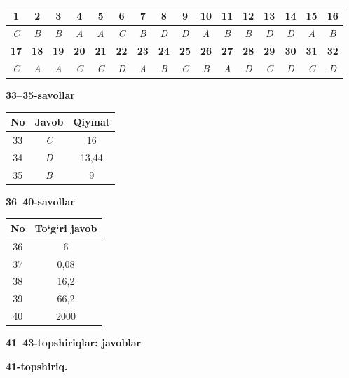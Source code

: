\documentclass[11pt,a4paper]{article}
\begin{document}
\noindent\begin{tabular}{|c|c|c|c|c|c|c|c|c|c|c|c|c|c|c|c|}\hline
\textbf{1} & \textbf{2} & \textbf{3} & \textbf{4} & \textbf{5} & \textbf{6} & \textbf{7} & \textbf{8} & \textbf{9} & \textbf{10} & \textbf{11} & \textbf{12} & \textbf{13} & \textbf{14} & \textbf{15} & \textbf{16}\\\hline
\textsl{C} & \textsl{B} & \textsl{B} & \textsl{A} & \textsl{A} & \textsl{C} & \textsl{B} & \textsl{D} & \textsl{D} & \textsl{A} & \textsl{B} & \textsl{B} & \textsl{D} & \textsl{D} & \textsl{A} & \textsl{B}\\\hline
\textbf{17} & \textbf{18} & \textbf{19} & \textbf{20} & \textbf{21} & \textbf{22} & \textbf{23} & \textbf{24} & \textbf{25} & \textbf{26} & \textbf{27} & \textbf{28} & \textbf{29} & \textbf{30} & \textbf{31} & \textbf{32}\\\hline
\textsl{C} & \textsl{A} & \textsl{A} & \textsl{C} & \textsl{C} & \textsl{D} & \textsl{A} & \textsl{B} & \textsl{C} & \textsl{B} & \textsl{A} & \textsl{D} & \textsl{C} & \textsl{D} & \textsl{C} & \textsl{D}\\\hline
\end{tabular}\par\medskip
\noindent\textbf{33--35-savollar}\par\smallskip
\noindent\begin{tabular}{|c|c|c|}\hline \textbf{No} & \textbf{Javob} & \textbf{Qiymat}\\\hline
33 & \textsl{C} & 16\\\hline
34 & \textsl{D} & 13,44\\\hline
35 & \textsl{B} & 9\\\hline
\end{tabular}\par\medskip
\noindent\textbf{36--40-savollar}\par\smallskip
\noindent\begin{tabular}{|c|c|}\hline \textbf{No} & \textbf{To`g`ri javob}\\\hline
36 & 6\\\hline
37 & 0,08\\\hline
38 & 16,2\\\hline
39 & 66,2\\\hline
40 & 2000\\\hline
\end{tabular}\par\medskip
\noindent\textbf{41--43-topshiriqlar: javoblar}\par\smallskip
\noindent\textbf{41-topshiriq.}\par
\end{document}
